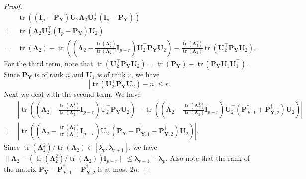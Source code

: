 \documentclass[12pt]{article} %
\DeclareMathOperator{\mytr}{tr}
\newcommand{\bP}{\mathbf{P}}
\newcommand{\bY}{\mathbf{Y}}
\newcommand{\bI}{\mathbf{I}}
\newcommand{\bU}{\mathbf{U}}
\newcommand{\bfsym}[1]{\ensuremath{\boldsymbol{#1}}}
\def\blambda {\bfsym {\lambda}}
\def\bLambda {\bfsym {\Lambda}}
\theoremstyle{definition}
\begin{document}
\begin{appendices}
\begin{proof}
\begin{equation}
        \begin{split}
        &\mytr\left(
         (\bI_p -\bP_\bY)\bU_2 \bLambda_2 \bU_2^\top (\bI_p- \bP_{\bY})
    \right)
    \\
    =&
        \mytr\left(
          \bLambda_2 \bU_2^\top (\bI_p- \bP_{\bY})\bU_2 
    \right)
    \\
    =&
    \mytr(\bLambda_2)
    -
        \mytr\left(
            \left(\bLambda_2-\frac{\mytr(\bLambda_2^2)}{\mytr(\bLambda_2)}\bI_{p-r}\right) \bU_2^\top \bP_{\bY} \bU_2 
    \right)
    -
    \frac{\mytr(\bLambda_2^2)}{\mytr(\bLambda_2)}
        \mytr\left(
           \bU_2^\top \bP_{\bY} \bU_2 
       \right).
        \end{split}
    \end{equation}
    For the third term, note that
    $
        \mytr\left(
           \bU_2^\top \bP_{\bY} \bU_2 
       \right)
       =
       \mytr(\bP_\bY)
       -
        \mytr\left(
            \bP_{\bY} \bU_1 \bU_1^\top
       \right)
       $.
       Since $\bP_{\bY}$ is of rank $n$ and $\bU_1$ is of rank $r$, we have
       \begin{equation}\label{ranklr}
       |
        \mytr\left(
           \bU_2^\top \bP_{\bY} \bU_2 
       \right)
       -
       n
       |
       \leq r
       .
       \end{equation}
       Next we deal with the second term.
       We have
       \begin{equation*}
           \begin{split}
        &\left|
        \mytr\left(
            \left(\bLambda_2-\frac{\mytr(\bLambda_2^2)}{\mytr(\bLambda_2)}\bI_{p-r}\right) \bU_2^\top \bP_{\bY} \bU_2 
    \right)
    -
        \mytr\left(
            \left(\bLambda_2-\frac{\mytr(\bLambda_2^2)}{\mytr(\bLambda_2)}\bI_{p-r}\right) \bU_2^\top \left(\bP_{\bY,1}^\dagger+\bP_{\bY,2}^\dagger\right) \bU_2 
    \right)
    \right|\\
    =&
    \left|
        \mytr\left(
            \left(\bLambda_2-\frac{\mytr(\bLambda_2^2)}{\mytr(\bLambda_2)}\bI_{p-r}\right) \bU_2^\top \left(\bP_{\bY}-\bP_{\bY,1}^\dagger-\bP_{\bY,2}^\dagger\right) \bU_2 
    \right)
    \right|.
           \end{split}
       \end{equation*}
       Since ${\mytr(\bLambda_2^2)}/{\mytr(\bLambda_2)}\in[\blambda_{p},\blambda_{r+1}]$, we have
       $\|\bLambda_2-({\mytr(\bLambda_2^2)}/{\mytr(\bLambda_2)})\bI_{p-r}\|\leq \blambda_{r+1}-\blambda_p$.
       Also note that the rank of the matrix $\bP_{\bY}-\bP_{\bY,1}^\dagger-\bP_{\bY,2}^\dagger$ is at most $2n$.

\end{proof}
\end{appendices}
\end{document}
